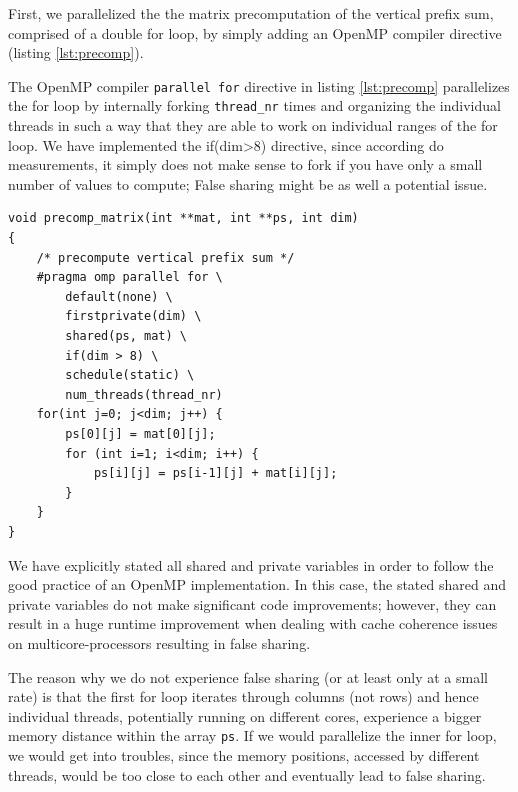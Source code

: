 \documentclass[conference]{IEEEtran}
\begin{document}
First, we parallelized the the matrix precomputation of the vertical prefix sum, comprised of a double for loop, by simply adding an OpenMP compiler directive (listing \ref{lst:precomp}).

The OpenMP compiler \texttt{parallel for} directive in listing \ref{lst:precomp} parallelizes the for loop by internally forking \texttt{thread\_nr} times and organizing the individual threads in such a way that they are able to work on individual ranges of the for loop. We have implemented the if(dim>8) directive, since according do measurements, it simply does not make sense to fork if you have only a small number of values to compute; False sharing might be as well a potential issue. 

\begin{center}
   \begin{lstlisting}[captionpos=b, caption=OpenMP: Parallel Matrix Pre-Computation of the Vertical Sum, label=lst:precomp]                                            
void precomp_matrix(int **mat, int **ps, int dim)                                  
{                                             
    /* precompute vertical prefix sum */  
    #pragma omp parallel for \ 
        default(none) \        
        firstprivate(dim) \    
        shared(ps, mat) \      
        if(dim > 8) \          
        schedule(static) \     
        num_threads(thread_nr)     
    for(int j=0; j<dim; j++) {                
        ps[0][j] = mat[0][j];                 
        for (int i=1; i<dim; i++) {           
            ps[i][j] = ps[i-1][j] + mat[i][j];
        }                                     
    }                                         
}                                             
   \end{lstlisting}
\end{center}


We have explicitly stated all shared and private variables in order to follow the good practice of an OpenMP implementation. In this case, the stated shared and private variables do not make significant code improvements; however, they can result in a huge runtime improvement when dealing with cache coherence issues on multicore-processors resulting in false sharing. 

The reason why we do not experience false sharing (or at least only at a small rate) is that the first for loop iterates through columns (not rows) and hence individual threads, potentially running on different cores, experience a bigger memory distance within the array \texttt{ps}. If we would parallelize the inner for loop, we would get into troubles, since the memory positions, accessed by different threads, would be too close to each other and eventually lead to false sharing. 
\end{document}
